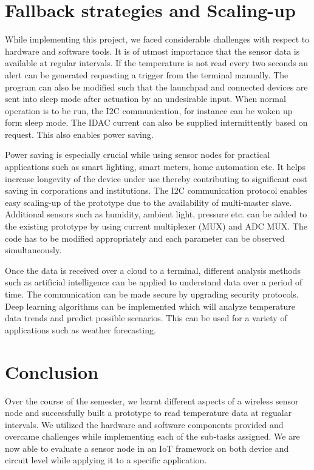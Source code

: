 \documentclass[conference]{IEEEtran}
\begin{document}
\section{Fallback strategies and Scaling-up}
While implementing this project, we faced considerable challenges with respect to hardware and software tools. It is of utmost importance that the sensor data is available at regular intervals. If the temperature is not read every two seconds an alert can be generated requesting a trigger from the terminal manually. The program can also be modified such that the launchpad and connected devices are sent into sleep mode after actuation by an undesirable input. When normal operation is to be run, the I2C communication, for instance can be woken up form sleep mode. The IDAC current can also be supplied intermittently based on request. This also enables power saving.

Power saving is especially crucial while using sensor nodes for practical applications such as smart lighting, smart meters, home automation etc. It helps increase longevity of the device under use thereby contributing to significant cost saving in corporations and institutions. The I2C communication protocol enables easy scaling-up of the prototype due to the availability of multi-master slave. Additional sensors such as humidity, ambient light, pressure etc. can be added to the existing prototype by using current multiplexer (MUX) and ADC MUX. The code has to be modified appropriately and each parameter can be observed simultaneously. 

Once the data is received over a cloud to a terminal, different analysis methods such as artificial intelligence can be applied to understand data over a period of time. The communication can be made secure by upgrading security protocols. Deep learning algorithms can be implemented which will analyze temperature data trends and predict possible scenarios. This can be used for a variety of applications such as weather forecasting. 

\section{Conclusion}
Over the course of the semester, we learnt different aspects of a wireless sensor node and successfully built a prototype to read temperature data at regualar intervals. We utilized the hardware and software components provided and overcame challenges while implementing each of the sub-tasks assigned. We are now able to evaluate a sensor node in an IoT framework on both device and circuit level while applying it to a specific application.
\end{document}
